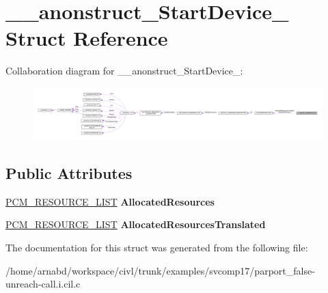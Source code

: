 \hypertarget{struct____anonstruct__StartDevice__82}{}\section{\+\_\+\+\_\+anonstruct\+\_\+\+Start\+Device\+\_ Struct Reference}
\label{struct____anonstruct__StartDevice__82}


Collaboration diagram for \+\_\+\+\_\+anonstruct\+\_\+\+Start\+Device\+\_\+:
\nopagebreak
\begin{figure}[H]
\begin{center}
\leavevmode
\includegraphics[width=350pt]{struct____anonstruct__StartDevice__82__coll__graph}
\end{center}
\end{figure}
\subsection*{Public Attributes}
\begin{DoxyCompactItemize}
\item 
\hypertarget{struct____anonstruct__StartDevice__82_acea7d2b50a486e89af81093678779ee6}{}\hyperlink{struct__CM__RESOURCE__LIST}{P\+C\+M\+\_\+\+R\+E\+S\+O\+U\+R\+C\+E\+\_\+\+L\+I\+S\+T} {\bfseries Allocated\+Resources}\label{struct____anonstruct__StartDevice__82_acea7d2b50a486e89af81093678779ee6}

\item 
\hypertarget{struct____anonstruct__StartDevice__82_a71d51960a2cc8d94c9cc9adbf6c0119c}{}\hyperlink{struct__CM__RESOURCE__LIST}{P\+C\+M\+\_\+\+R\+E\+S\+O\+U\+R\+C\+E\+\_\+\+L\+I\+S\+T} {\bfseries Allocated\+Resources\+Translated}\label{struct____anonstruct__StartDevice__82_a71d51960a2cc8d94c9cc9adbf6c0119c}

\end{DoxyCompactItemize}


The documentation for this struct was generated from the following file\+:\begin{DoxyCompactItemize}
\item 
/home/arnabd/workspace/civl/trunk/examples/svcomp17/parport\+\_\+false-\/unreach-\/call.\+i.\+cil.\+c\end{DoxyCompactItemize}
